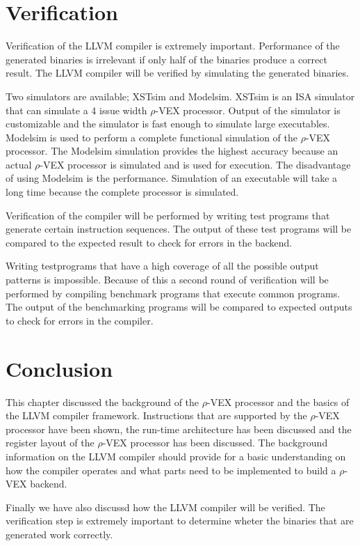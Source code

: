 \section{Verification}
Verification of the LLVM compiler is extremely important. Performance of the generated binaries is irrelevant if only half of the binaries produce a correct result. The LLVM compiler will be verified by simulating the generated binaries. 

Two simulators are available; XSTsim and Modelsim. XSTsim is an ISA simulator that can simulate a 4 issue width $\rho$-VEX processor. Output of the simulator is customizable and the simulator is fast enough to simulate large executables. Modelsim is used to perform a complete functional simulation of the $\rho$-VEX processor. The Modelsim simulation provides the highest accuracy because an actual $\rho$-VEX processor is simulated and is used for execution. The disadvantage of using Modelsim is the performance. Simulation of an executable will take a long time because the complete processor is simulated.

Verification of the compiler will be performed by writing test programs that generate certain instruction sequences. The output of these test programs will be compared to the expected result to check for errors in the backend.

Writing testprograms that have a high coverage of all the possible output patterns is impossible. Because of this a second round of verification will be performed by compiling benchmark programs that execute common programs. The output of the benchmarking programs will be compared to expected outputs to check for errors in the compiler.

\section{Conclusion}
This chapter discussed the background of the $\rho$-VEX processor and the basics of the LLVM compiler framework. Instructions that are supported by the $\rho$-VEX processor have been shown, the run-time architecture has been discussed and the register layout of the $\rho$-VEX processor has been discussed. The background information on the LLVM compiler should provide for a basic understanding on how the compiler operates and what parts need to be implemented to build a $\rho$-VEX backend.

Finally we have also discussd how the LLVM compiler will be verified. The verification step is extremely important to determine wheter the binaries that are generated work correctly.

\acresetall
